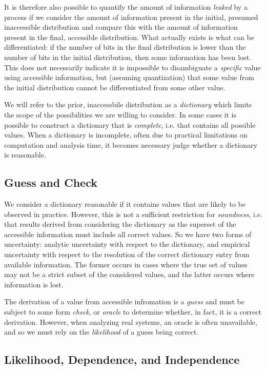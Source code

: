 It is therefore also possible to quantify the amount of information \emph{leaked} by a process if we consider the amount of information present in the initial, presumed inaccessible distribution and compare this with the amount of information present in the final, accessible distribution.
What actually exists is what can be differentiated: if the number of bits in the final distribution is lower than the number of bits in the initial distribution, then some information has been lost.
This does not necessarily indicate it is impossible to disambiguate a \emph{specific} value using accessible information, but (assuming quantization) that some value from the initial distribution cannot be differentiated from some other value.

We will refer to the prior, inaccessbile distribution as a \emph{dictionary} which limits the scope of the possibilities we are willing to consider.
In some cases it is possible to construct a dictionary that is \emph{complete}, i.e. that contains all possible values.
When a dictionary is incomplete, often due to practical limitations on computation and analysis time, it becomes necessary judge whether a dictionary is reasonable.

\subsection{Guess and Check}

We consider a dictionary reasonable if it contains values that are likely to be observed in practice.
However, this is not a sufficient restriction for \emph{soundness}, i.e. that results derived from considering the dictionary as the superset of the accessible information must include all correct values.
So we have two forms of uncertainty: analytic uncertainty with respect to the dictionary, and empirical uncertainty with respect to the resolution of the correct dictionary entry from available information.
The former occurs in cases where the true set of values may not be a strict subset of the considered values, and the latter occurs where information is lost.

The derivation of a value from accessible infromation is a \emph{guess} and must be subject to some form \emph{check}, or \emph{oracle} to determine whether, in fact, it is a correct derivation.
However, when analyzing real systems, an oracle is often unavailable, and so we must rely on the \emph{likelihood} of a guess being correct.

\subsection{Likelihood, Dependence, and Independence}


